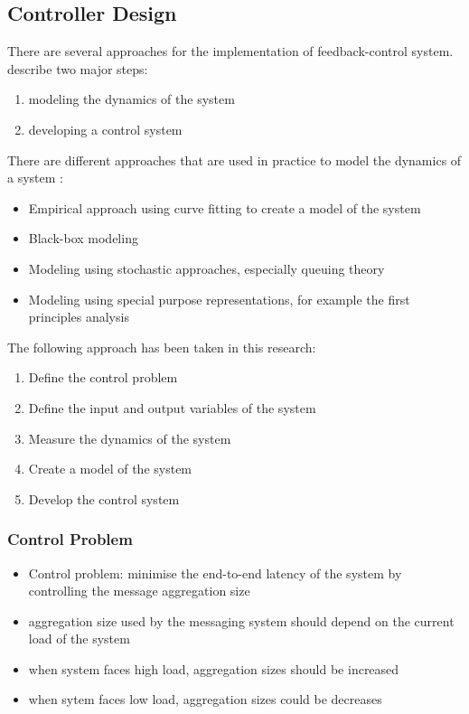 \subsection{Controller Design}
\label{sec:ch05_controller_design}

There are several approaches for the implementation of feedback-control system. \cite{Hellerstein:2004a} describe two major steps:
\begin{enumerate}
	\item modeling the dynamics of the system
	\item developing a control system
\end{enumerate}

There are different approaches that are used in practice to model the dynamics of a system \citep{Hellerstein:2004tu}:
\begin{itemize}
	\item Empirical approach using curve fitting to create a model of the system
	\item Black-box modeling
	\item Modeling using stochastic approaches, especially queuing theory
	\item Modeling using special purpose representations, for example the first principles analysis
\end{itemize}

The following approach has been taken in this research:

\begin{enumerate}
	\item Define the control problem
	\item Define the input and output variables of the system
	\item Measure the dynamics of the system
	\item Create a model of the system
	\item Develop the control system
\end{enumerate}

\subsubsection{Control Problem}

\begin{itemize}
	\item Control problem: minimise the end-to-end latency of the system by controlling the message aggregation size
	\item aggregation size used by the messaging system should depend on the current load of the system
	\item when system faces high load, aggregation sizes should be increased
	\item when sytem faces low load, aggregation sizes could be decreases
\end{itemize}
